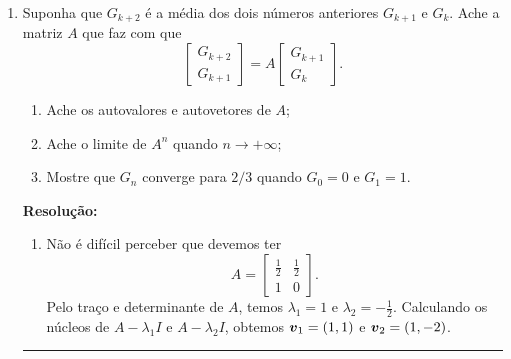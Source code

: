 \documentclass[leqno]{article}
\numberwithin{equation}{section}
\newenvironment{sol} 
{
    \vspace{4mm}
    \noindent\textbf{Resolução:}
    \strut\newline
    \smallskip
    \hspace{-3.5mm} 
} 
{\noindent\rule{4cm}{.1mm}}
\begin{document}
\begin{enumerate}
\item Suponha que $G_{k+2}$ é a média dos dois números anteriores $G_{k+1}$ e $G_k$. Ache a matriz $A$ que faz com que
$$\begin{bmatrix}
G_{k+2}\\
G_{k+1}\end{bmatrix} = A \begin{bmatrix}
G_{k+1}\\
G_k\end{bmatrix}.$$

\begin{enumerate}

\item Ache os autovalores e autovetores de $A$;

\item Ache o limite de $A^n$ quando $n \to +\infty$;

\item Mostre que $G_n$ converge para $2/3$ quando $G_0 = 0$ e $G_1 = 1$.

\end{enumerate}

\begin{sol}

    \begin{enumerate}[label=(\alph*)]
        \item Não é difícil perceber que devemos ter
            \begin{equation*}
                A =
                \begin{bmatrix}
                    \frac{ 1 }{ 2 } & \frac{ 1 }{ 2 } \\
                    1 & 0
                \end{bmatrix}
            .\end{equation*}
            Pelo traço e determinante de \( A \), temos \( \lambda_{ 1 } = 1 \) e \( \lambda_{ 2 } = - \frac{ 1 }{ 2 } \).
            Calculando os núcleos de \( A - \lambda_{ 1 } I \) e \( A - \lambda_{ 2 } I \), obtemos \( \boldsymbol{v}_{ 1 } = ( 1, 1 ) \) e \( \boldsymbol{v}_{ 2 } = ( 1 , - 2 ) \).


\end{enumerate}
\end{sol}
\end{enumerate}
\end{document}

